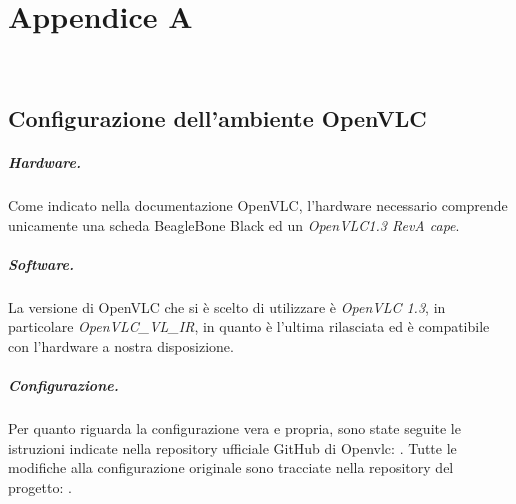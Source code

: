 \chapter{Appendice A}
\label{app:A}

\\

\section{Configurazione dell'ambiente OpenVLC}

\paragraph{Hardware.} Come indicato nella documentazione OpenVLC, l'hardware necessario comprende unicamente una scheda BeagleBone Black ed un \textit{OpenVLC1.3 RevA cape}.

\paragraph{Software.} La versione di OpenVLC che si è scelto di utilizzare è \textit{OpenVLC 1.3}, in particolare \textit{OpenVLC\_VL\_IR}, in quanto è l'ultima rilasciata ed è compatibile con l'hardware a nostra disposizione.

\paragraph{Configurazione.} Per quanto riguarda la configurazione vera e propria, sono state seguite le istruzioni indicate nella repository ufficiale GitHub di Openvlc: \cite{site:openvlc-github}. Tutte le modifiche alla configurazione originale sono tracciate nella repository del progetto: \cite{site:openvlc-pa-github}.

